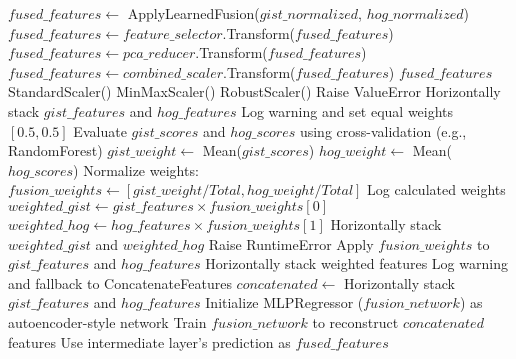 \begin{algorithm}[!htbp]
\begin{algorithmic}[1]
        \State $fused\_features \leftarrow$ ApplyLearnedFusion($gist\_normalized$, $hog\_normalized$)
    \EndIf
        \State $fused\_features \leftarrow feature\_selector$.Transform($fused\_features$)
    \EndIf
        \State $fused\_features \leftarrow pca\_reducer$.Transform($fused\_features$)
    \EndIf
        \State $fused\_features \leftarrow combined\_scaler$.Transform($fused\_features$)
    \EndIf
    \Return $fused\_features$
\EndProcedure
\Statex
{}
     \Return StandardScaler()
     \Return MinMaxScaler()
     \Return RobustScaler()
    \Else \State Raise ValueError
    \EndIf
\EndFunction
\Statex
{}
    \Return Horizontally stack $gist\_features$ and $hog\_features$
\EndFunction
\Statex
{}
     Log warning and set equal weights $[0.5, 0.5]$
    \Else
        \State Evaluate $gist\_scores$ and $hog\_scores$ using cross-validation (e.g., RandomForest)
        \State $gist\_weight \leftarrow$ Mean($gist\_scores$)
        \State $hog\_weight \leftarrow$ Mean($hog\_scores$)
        \State Normalize weights: $fusion\_weights \leftarrow [gist\_weight / Total, hog\_weight / Total]$
        \State Log calculated weights
    \EndIf
    \State $weighted\_gist \leftarrow gist\_features \times fusion\_weights[0]$
    \State $weighted\_hog \leftarrow hog\_features \times fusion\_weights[1]$
    \Return Horizontally stack $weighted\_gist$ and $weighted\_hog$
\EndProcedure
\Statex
{}
     \State Raise RuntimeError \EndIf
    \State Apply $fusion\_weights$ to $gist\_features$ and $hog\_features$
    \Return Horizontally stack weighted features
\EndProcedure
\Statex
{}
     Log warning and fallback to ConcatenateFeatures \EndIf
    \State $concatenated \leftarrow$ Horizontally stack $gist\_features$ and $hog\_features$
    \State Initialize MLPRegressor ($fusion\_network$) as autoencoder-style network
    \State Train $fusion\_network$ to reconstruct $concatenated$ features
    \State Use intermediate layer's prediction as $fused\_features$

\end{algorithmic}
\end{algorithm}
